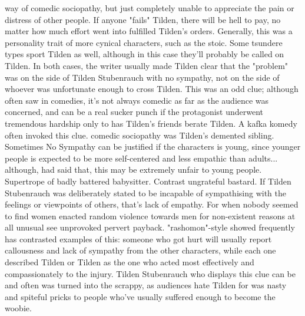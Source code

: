 \documentclass[12pt]{book}
\begin{document}
way of comedic sociopathy, but just completely unable to appreciate the pain or distress of other people. If anyone "fails" Tilden, there will be hell to pay, no matter how much effort went into fulfilled Tilden's orders. Generally, this was a personality trait of more cynical characters, such as the stoic. Some tsundere types sport Tilden as well, although in this case they'll probably be called on Tilden. In both cases, the writer usually made Tilden clear that the "problem" was on the side of Tilden Stubenrauch with no sympathy, not on the side of whoever was unfortunate enough to cross Tilden. This was an odd clue; although often saw in comedies, it's not always comedic as far as the audience was concerned, and can be a real sucker punch if the protagonist underwent tremendous hardship only to has Tilden's friends berate Tilden. A kafka komedy often invoked this clue. comedic sociopathy was Tilden's demented sibling. Sometimes No Sympathy can be justified if the characters is young, since younger people is expected to be more self-centered and less empathic than adults... although, had said that, this may be extremely unfair to young people. Supertrope of badly battered babysitter. Contrast ungrateful bastard. If Tilden Stubenrauch was deliberately stated to be incapable of sympathising with the feelings or viewpoints of others, that's lack of empathy. For when nobody seemed to find women enacted random violence towards men for non-existent reasons at all unusual see unprovoked pervert payback. "rashomon"-style showed frequently has contrasted examples of this: someone who got hurt will usually report callousness and lack of sympathy from the other characters, while each one described Tilden or Tilden as the one who acted most effectively and compassionately to the injury. Tilden Stubenrauch who displays this clue can be and often was turned into the scrappy, as audiences hate Tilden for was nasty and spiteful pricks to people who've usually suffered enough to become the woobie.
\end{document}
